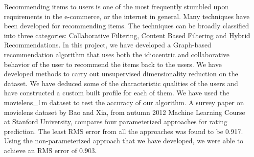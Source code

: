 \documentclass{report}
\begin{document}
\begin{projectAbstract}
Recommending items to users is one of the most frequently stumbled upon requirements in the e-commerce, or the internet in general. Many techniques have been developed for recommending items. The techniques can be broadly classified into three categories: Collaborative Filtering, Content Based Filtering and Hybrid Recommendations. In this project, we have developed a Graph-based recommendation algorithm that uses both the idiocentric and collaborative behavior of the user to recommend the items back to the users. We have developed methods to carry out unsupervised dimensionality reduction on the dataset. We have deduced some of the characteristic qualities of the users and have constructed a custom built profile for each of them. We have used the movielens\_1m dataset to test the accuracy of our algorithm. A survey paper on movielens dataset by Bao and Xia, from autumn 2012 Machine Learning Course at Stanford University, compares four parameterized approaches for rating prediction. The least RMS error from 
all the approaches was found to be 0.917. Using the non-parameterized approach that we have developed, we were able to achieve an RMS error of 0.903.
\end{projectAbstract}





\newpage
\tableofcontents
\newpage
\end{document}
